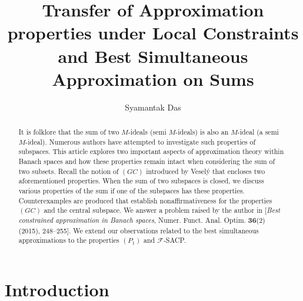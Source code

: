 \documentclass[11pt]{amsart}
\newcommand{\mr}{\mathscr}
\begin{document}
\title[Local constraints and Best Simultaneous Approximation]{Transfer of Approximation properties under Local Constraints and Best Simultaneous Approximation on Sums}

\author[Das]{Syamantak Das}

\newcommand{\Addresses}{{%
  \bigskip
  \footnotesize
  Syamantak Das, \textsc{National Institute of Technology Sikkim, India }\par\nopagebreak
  \textit{E-mail address}, Syamantak Das: \texttt{syamantakdas@nitsikkim.ac.in}
 
}}

\begin{abstract}

It is folklore that the sum of two $M$-ideals (semi $M$-ideals) is also an $M$-ideal (a semi $M$-ideal). Numerous authors have attempted to investigate such properties of subspaces. This article explores two important aspects of approximation theory within Banach spaces and how these properties remain intact when considering the sum of two subsets. Recall the notion of $(GC)$ introduced by Vesel\'y that encloses two aforementioned properties. When the sum of two subspaces is closed, we discuss various properties of the sum if one of the subspaces has these properties. Counterexamples are produced that establish nonaffirmativeness for the properties $(GC)$ and the central subspace.
We answer a problem raised by the author in [{\em Best constrained approximation in Banach spaces}, Numer. Funct. Anal. Optim. {\bf 36}(2) (2015),  248--255]. We extend our observations related to the best simultaneous approximations to the properties $(P_1)$ and $\mr{F}$-SACP.

\end{abstract}
 \maketitle
\section{Introduction}
\end{document}
